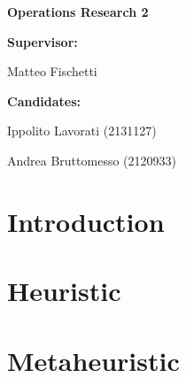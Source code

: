 \documentclass[a4paper,12pt]{report}
\newcommand\blankpage{%
    \null
    \thispagestyle{empty}%
    \addtocounter{page}{-1}%
    \newpage}
\begin{document}
\begin{titlepage}
\begin{center}
\textbf{\large Operations Research 2}\\
\vfill

\raggedright\textbf{\large Supervisor:} \\
\raggedright\large Matteo Fischetti\\
\vfill
\raggedright\textbf{\large Candidates:} \\
\raggedright\large Ippolito Lavorati  (2131127)\\
\raggedright\large Andrea Bruttomesso (2120933)\\

\vfill
{}

\end{center}
\end{titlepage}

    

    
\begin{abstract}

\end{abstract}

\clearpage{\pagestyle{plain}\cleardoublepage}
\tableofcontents

\clearpage{\pagestyle{plain}\cleardoublepage}


\clearpage{\pagestyle{plain}\cleardoublepage}
\chapter{Introduction}

\chapter{Heuristic}

\chapter{Metaheuristic}


    
%

\printbibliography
\end{document}
